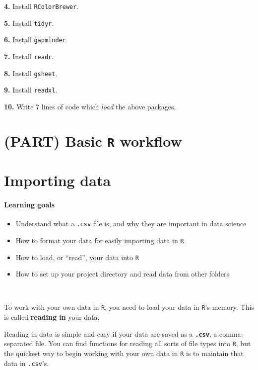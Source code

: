 \documentclass[
]{book}
\providecommand{\tightlist}{%
  \setlength{\itemsep}{0pt}\setlength{\parskip}{0pt}}
\begin{document}
\textbf{4.} Install \texttt{RColorBrewer}.

\textbf{5.} Install \texttt{tidyr}.

\textbf{6.} Install \texttt{gapminder}.

\textbf{7.} Install \texttt{readr}.

\textbf{8.} Install \texttt{gsheet}.

\textbf{9.} Install \texttt{readxl}.

\textbf{10.} Write 7 lines of code which \emph{load} the above packages.

\hypertarget{part-basic-r-workflow}{%
\chapter*{\texorpdfstring{(PART) Basic \texttt{R} workflow}{(PART) Basic R workflow}}\label{part-basic-r-workflow}}

\hypertarget{importing-data}{%
\chapter{Importing data}\label{importing-data}}

\hypertarget{learning-goals-7}{%
\subsubsection*{Learning goals}\label{learning-goals-7}}

\begin{itemize}
\tightlist
\item
  Understand what a \texttt{.csv} file is, and why they are important in data science
\item
  How to format your data for easily importing data in \texttt{R}
\item
  How to load, or ``read'', your data into \texttt{R}
\item
  How to set up your project directory and read data from other folders
\end{itemize}

~

To work with your own data in \texttt{R}, you need to load your data in \texttt{R}'s memory. This is called \textbf{reading in} your data.

Reading in data is simple and easy if your data are saved as a \textbf{\texttt{.csv}}, a comma-separated file. You can find functions for reading all sorts of file types into \texttt{R}, but the quickest way to begin working with your own data in \texttt{R} is to maintain that data in \texttt{.csv}'s.
\end{document}
